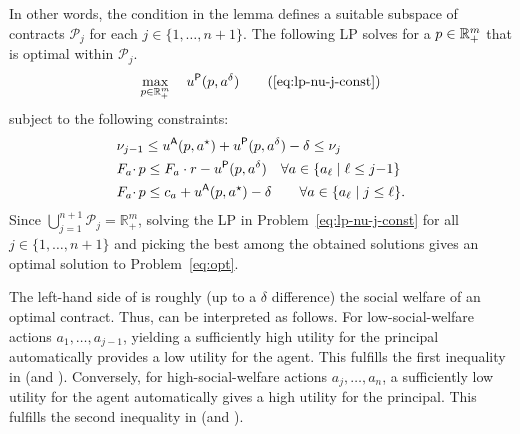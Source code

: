 In other words, the condition in the lemma defines a suitable subspace of contracts $\mathcal{P}_j$ for each $j \in \{1,\dots,n+1\}$. 
The following LP solves for a $p \in \mathbb{R}^{m}_{+}$ that is optimal within $\mathcal{P}_j$. 
\begin{align}
	\label{eq:lp-nu-j}
	\max_{p \in \mathbb{R}_+^m}
	\quad
	u^\sfP(p, a^\delta)
	\tag{\ref*{eq:lp-nu-j-const}}
\end{align}
subject to the following constraints:
\begin{subequations}
	\label{eq:lp-nu-j-const}
	\begin{align}
		&%
		\nu_{j-1} \le u^\sfA(p, a^\star) + u^\sfP(p, a^\delta) - \delta \le  \nu_j \label{eq:lp-nu-j-1} \\
		&%
		F_a {\cdot} \, p \le F_a \cdot r - u^\sfP(p, a^\delta)
		\quad \forall a \in \{a_\ell \mid  \ell \le j{-}1\}  \label{eq:lp-nu-j-2} \\
		&%
		F_a {\cdot} \, p \le c_a + u^\sfA(p, a^\star) - \delta
		\quad\quad \forall a \in \{a_\ell \mid j \le \ell \}. \label{eq:lp-nu-j-3}
	\end{align}
\end{subequations}
Since $\bigcup_{j=1}^{n+1} \mathcal{P}_j = \mathbb{R}^m_+$, solving the LP in Problem~\eqref{eq:lp-nu-j-const} for all $j \in \{1,\dots,n+1\}$ and picking the best among the obtained solutions gives an optimal solution to Problem~\eqref{eq:opt}.


\begin{remark}
	The left-hand side of  is roughly (up to a $\delta$ difference) the social welfare of an optimal contract.
	Thus,  can be interpreted as follows.
	For low-social-welfare actions $a_1,\dots, a_{j-1}$, yielding a sufficiently high utility for the principal automatically provides a low utility for the agent.
	This fulfills the first inequality in  (and ).
	Conversely, for high-social-welfare actions $a_j,\dots, a_n$, a sufficiently low utility for the agent automatically gives a high utility for the principal.
	This fulfills the second inequality in  (and ).
\end{remark}

